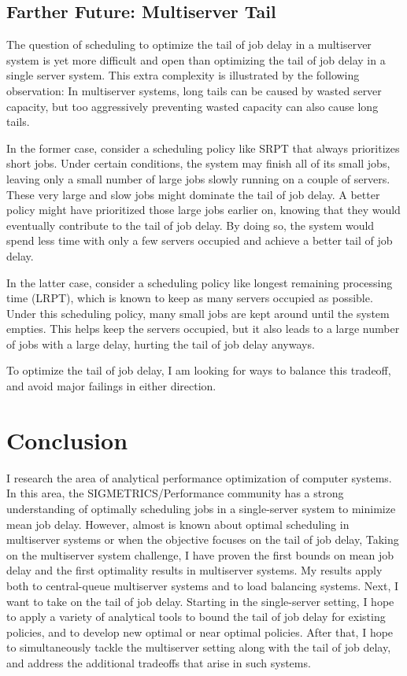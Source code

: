 \documentclass[11pt]{article}
\begin{document}
\subsection{Farther Future: Multiserver Tail}
The question of scheduling to optimize the tail of job delay in a multiserver system
is yet more difficult and open than optimizing the tail of job delay in a single server system.
This extra complexity is illustrated by the following observation:
In multiserver systems, long tails can be caused by wasted server capacity,
but too aggressively preventing wasted capacity can also cause long tails.

In the former case, consider a scheduling policy like SRPT
that always prioritizes short jobs.
Under certain conditions, the system may finish all of its small jobs,
leaving only a small number of large jobs slowly running on a couple of servers.
These very large and slow jobs might dominate the tail of job delay.
A better policy might have prioritized those large jobs earlier on,
knowing that they would eventually contribute to the tail of job delay.
By doing so, the system would spend less time with only a few servers occupied
and achieve a better tail of job delay.

In the latter case, consider a scheduling policy like longest remaining processing time (LRPT),
which is known to keep as many servers occupied as possible.
Under this scheduling policy, many small jobs are kept around until the system empties.
This helps keep the servers occupied,
but it also leads to a large number of jobs with a large delay,
hurting the tail of job delay anyways.

To optimize the tail of job delay, I am looking for ways to balance this tradeoff, and avoid major failings in either direction.
\section{Conclusion}
I research the area of analytical performance optimization of computer systems.
In this area, the SIGMETRICS/Performance community has a strong understanding
of optimally scheduling jobs in a single-server system to minimize mean job delay.
However, almost is known about optimal scheduling in multiserver systems
or when the objective focuses on the tail of job delay,
Taking on the multiserver system challenge,
I have proven the first bounds on mean job delay and the first optimality results
in multiserver systems.
My results apply both to central-queue multiserver systems
and to load balancing systems.
Next, I want to take on the tail of job delay.
Starting in the single-server setting,
I hope to apply a variety of analytical tools to bound the tail of job delay for existing policies,
and to develop new optimal or near optimal policies.
After that, I hope to simultaneously tackle the multiserver setting along with
the tail of job delay,
and address the additional tradeoffs that arise in such systems.

\footnotesize


\end{document}
